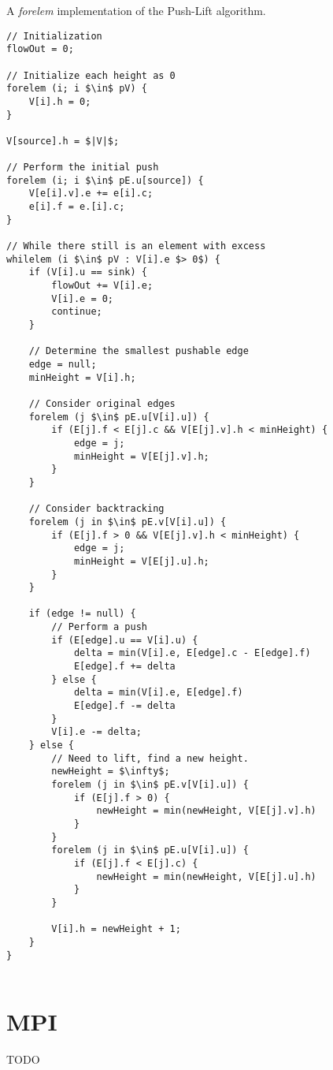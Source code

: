 \begin{algorithm}
\caption{A \textit{forelem} implementation of the Push-Lift algorithm.}
\label{algo:push-lift-forelem}

\begin{lstlisting}[mathescape]
// Initialization
flowOut = 0;

// Initialize each height as 0
forelem (i; i $\in$ pV) {
	V[i].h = 0;
}

V[source].h = $|V|$;

// Perform the initial push
forelem (i; i $\in$ pE.u[source]) {
	V[e[i].v].e += e[i].c;
	e[i].f = e.[i].c;
}

// While there still is an element with excess
whilelem (i $\in$ pV : V[i].e $> 0$) {
	if (V[i].u == sink) {
		flowOut += V[i].e;
		V[i].e = 0;
		continue;
	}

	// Determine the smallest pushable edge
	edge = null;
	minHeight = V[i].h;
	
	// Consider original edges
	forelem (j $\in$ pE.u[V[i].u]) {
		if (E[j].f < E[j].c && V[E[j].v].h < minHeight) {
			edge = j;
			minHeight = V[E[j].v].h;
		}
	}
	
	// Consider backtracking
	forelem (j in $\in$ pE.v[V[i].u]) {
		if (E[j].f > 0 && V[E[j].v].h < minHeight) {
			edge = j;
			minHeight = V[E[j].u].h;
		}
	}
	
	if (edge != null) {
		// Perform a push
		if (E[edge].u == V[i].u) {
			delta = min(V[i].e, E[edge].c - E[edge].f)
			E[edge].f += delta
		} else {
			delta = min(V[i].e, E[edge].f)
			E[edge].f -= delta
		}
		V[i].e -= delta;
	} else {
		// Need to lift, find a new height.
		newHeight = $\infty$;
		forelem (j in $\in$ pE.v[V[i].u]) {
			if (E[j].f > 0) {
				newHeight = min(newHeight, V[E[j].v].h)
			}
		}
		forelem (j in $\in$ pE.u[V[i].u]) {
			if (E[j].f < E[j].c) {
				newHeight = min(newHeight, V[E[j].u].h)
			}
		}
		
		V[i].h = newHeight + 1;
	}
}
 
\end{lstlisting}

\end{algorithm}


\section{MPI}

TODO
